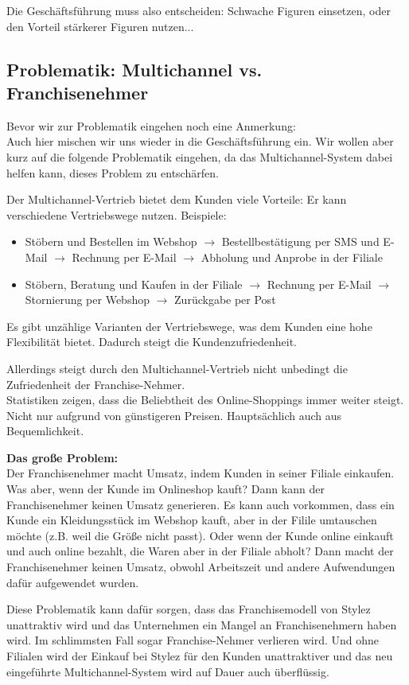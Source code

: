 Die Geschäftsführung muss also entscheiden: Schwache Figuren einsetzen, oder den Vorteil stärkerer Figuren nutzen...

\subsection{Problematik: Multichannel vs. Franchisenehmer}
Bevor wir zur Problematik eingehen noch eine Anmerkung:\\
Auch hier mischen wir uns wieder in die Geschäftsführung ein. Wir wollen aber kurz auf die folgende Problematik eingehen, da das Multichannel-System dabei helfen kann, dieses Problem zu entschärfen.

Der Multichannel-Vertrieb bietet dem Kunden viele Vorteile: Er kann verschiedene Vertriebswege nutzen. Beispiele:
\begin{itemize}
\item Stöbern und Bestellen im Webshop $\rightarrow$ Bestellbestätigung per SMS und E-Mail $\rightarrow$ Rechnung per E-Mail $\rightarrow$ Abholung und Anprobe in der Filiale
\item Stöbern, Beratung und Kaufen in der Filiale $\rightarrow$ Rechnung per E-Mail $\rightarrow$ Stornierung per Webshop $\rightarrow$ Zurückgabe per Post
\end{itemize}
Es gibt unzählige Varianten der Vertriebswege, was dem Kunden eine hohe Flexibilität bietet. Dadurch steigt die Kundenzufriedenheit.

Allerdings steigt durch den Multichannel-Vertrieb nicht unbedingt die Zufriedenheit der Franchise-Nehmer.\\
Statistiken zeigen, dass die Beliebtheit des Online-Shoppings immer weiter steigt. Nicht nur aufgrund von günstigeren Preisen. Hauptsächlich auch aus Bequemlichkeit.

\textbf{Das große Problem:}\\
Der Franchisenehmer macht Umsatz, indem Kunden in seiner Filiale einkaufen.\\
Was aber, wenn der Kunde im Onlineshop kauft? Dann kann der Franchisenehmer keinen Umsatz generieren. Es kann auch vorkommen, dass ein Kunde ein Kleidungsstück im Webshop kauft, aber in der Filile umtauschen möchte (z.B. weil die Größe nicht passt). Oder wenn der Kunde online einkauft und auch online bezahlt, die Waren aber in der Filiale abholt? Dann macht der Franchisenehmer keinen Umsatz, obwohl Arbeitszeit und andere Aufwendungen dafür aufgewendet wurden.

Diese Problematik kann dafür sorgen, dass das Franchisemodell von Stylez unattraktiv wird und das Unternehmen ein Mangel an Franchisenehmern haben wird. Im schlimmsten Fall sogar Franchise-Nehmer verlieren wird. Und ohne Filialen wird der Einkauf bei Stylez für den Kunden unattraktiver und das neu eingeführte Multichannel-System wird auf Dauer auch überflüssig.

